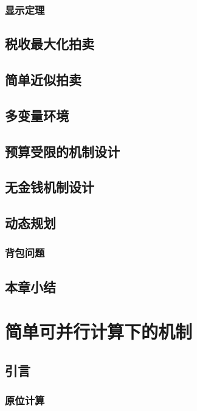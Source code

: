 \documentclass[promaster]{thesis-uestc}
\begin{document}
    \subsection{显示定理}

\section{税收最大化拍卖}

\section{简单近似拍卖}

\section{多变量环境}

\section{预算受限的机制设计}

\section{无金钱机制设计}

\section{动态规划}

\subsection{背包问题}

\section{本章小结}

\chapter{简单可并行计算下的机制}

\section{引言}
\subsection{原位计算}
\end{document}
